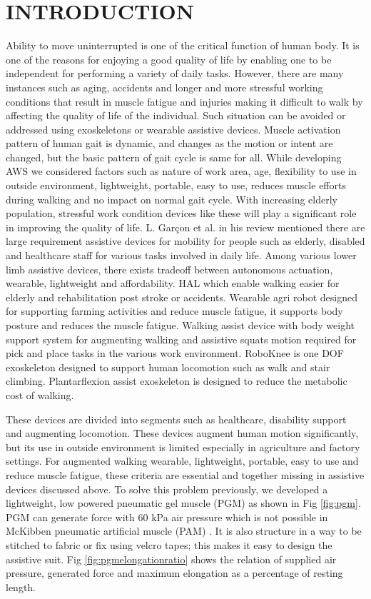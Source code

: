 \documentclass[letterpaper, 10 pt, conference]{ieeeconf}  %
\begin{document}
\section{INTRODUCTION}
Ability to move uninterrupted is one of the critical function of human body. It is one of the reasons for enjoying a good quality of life by enabling one to be independent for performing a variety of daily tasks. However, there are many instances such as aging, accidents and longer and more stressful working conditions that result in muscle fatigue and injuries making it difficult to walk by affecting the quality of life of the individual. Such situation can be avoided or addressed using exoskeletons or wearable assistive devices. Muscle activation pattern of human gait is dynamic, and changes as the motion or intent are changed, but the basic pattern of gait cycle is same for all. While developing AWS we considered factors such as nature of work area, age, flexibility to use in outside environment, lightweight, portable, easy to use, reduces muscle efforts during walking and no impact on normal gait cycle. With increasing elderly population, stressful work condition devices like these will play a significant role in improving the quality of life. L. Garçon et al. \cite{1} in his review mentioned there are large requirement assistive devices for mobility for people such as elderly, disabled and healthcare staff for various tasks involved in daily life. Among various lower limb assistive devices, there exists tradeoff between autonomous actuation, wearable, lightweight and affordability. HAL \cite{2} which enable walking easier for elderly and rehabilitation post stroke or accidents. Wearable agri robot \cite{3} designed for supporting farming activities and reduce muscle fatigue, it supports body posture and reduces the muscle fatigue. Walking assist device with body weight support system \cite{4} for augmenting walking and assistive squats motion required for pick and place tasks in the various work environment. RoboKnee \cite{5} is one DOF exoskeleton designed to support human locomotion such as walk and stair climbing. Plantarflexion assist exoskeleton \cite{6} is designed to reduce the metabolic cost of walking. 

These devices are divided into segments such as healthcare, disability support and augmenting locomotion. These devices augment human motion significantly, but its use in outside environment is limited especially in agriculture and factory settings. For augmented walking wearable, lightweight, portable, easy to use and reduce muscle fatigue, these criteria are essential and together missing in assistive devices discussed above. To solve this problem previously, we developed a lightweight, low powered pneumatic gel muscle (PGM) \cite{7} as shown in Fig \ref{fig:pgm}. PGM can generate force with 60 kPa air pressure which is not possible in McKibben pneumatic artificial muscle (PAM) \cite{8}. It is also structure in a way to be stitched to fabric or fix using velcro tapes; this makes it easy to design the assistive suit. Fig \ref{fig:pgmelongationratio} shows the relation of supplied air pressure, generated force and maximum elongation as a percentage of resting length.
\end{document}
